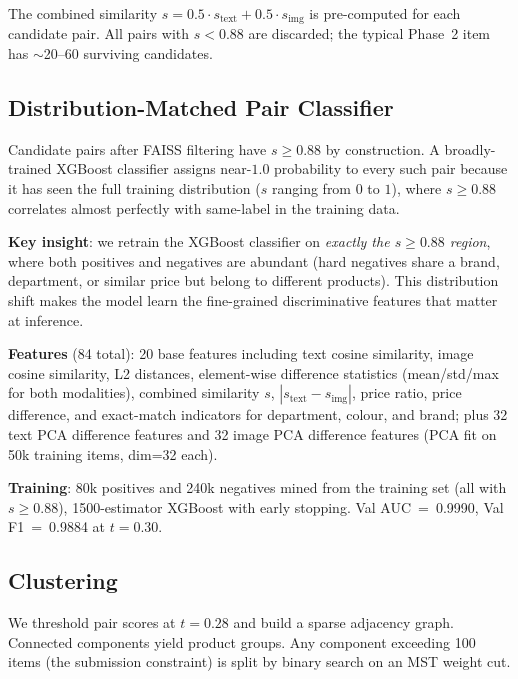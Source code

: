 \documentclass[10pt,twocolumn]{article}
\begin{document}
The combined similarity $s = 0.5 \cdot s_\text{text} + 0.5 \cdot s_\text{img}$ is
pre-computed for each candidate pair. All pairs with $s < 0.88$ are
discarded; the typical Phase~2 item has $\sim$20--60 surviving candidates.

\subsection{Distribution-Matched Pair Classifier}

Candidate pairs after FAISS filtering have $s \geq 0.88$ by construction.
A broadly-trained XGBoost classifier assigns near-$1.0$ probability to
every such pair because it has seen the full training distribution ($s$
ranging from $0$ to $1$), where $s \geq 0.88$ correlates almost perfectly
with same-label in the training data.

\textbf{Key insight}: we retrain the XGBoost classifier on
\emph{exactly the $s \geq 0.88$ region}, where both positives and
negatives are abundant (hard negatives share a brand, department, or
similar price but belong to different products). This distribution
shift makes the model learn the fine-grained discriminative features
that matter at inference.

\textbf{Features} (84 total): 20 base features including text cosine
similarity, image cosine similarity, L2 distances, element-wise
difference statistics (mean/std/max for both modalities), combined
similarity $s$, $|s_\text{text} - s_\text{img}|$, price ratio, price
difference, and exact-match indicators for department, colour, and brand;
plus 32 text PCA difference features and 32 image PCA difference features
(PCA fit on 50k training items, dim=32 each).

\textbf{Training}: 80k positives and 240k negatives mined from the
training set (all with $s \geq 0.88$), 1500-estimator XGBoost with
early stopping. Val AUC~=~0.9990, Val F1~=~0.9884 at $t=0.30$.

\subsection{Clustering}

We threshold pair scores at $t = 0.28$ and build a sparse adjacency
graph. Connected components yield product groups. Any component
exceeding 100 items (the submission constraint) is split by binary
search on an MST weight cut.

\end{document}
